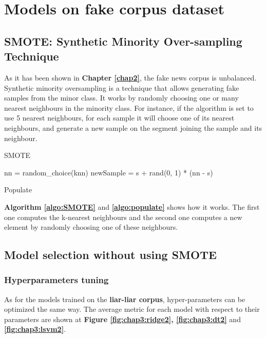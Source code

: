 \section{Models on fake corpus dataset}
\subsection{SMOTE: Synthetic Minority Over-sampling Technique\cite{Chawla2011}}
As it has been shown in \textbf{Chapter \ref{chap2}}, the fake news corpus is unbalanced. Synthetic minority oversampling is a technique that allows generating fake samples from the minor class. It works by randomly choosing one or many nearest neighbours in the minority class. For instance, if the algorithm is set to use 5 nearest neighbours, for each sample it will choose one of its nearest neighbours, and generate a new sample on the segment joining the sample and its neighbour. 
\begin{algorithm}
  \caption{SMOTE}
  \label{algo:SMOTE}
\end{algorithm}
\begin{algorithm}
 nn = random\_choice(knn)\;
 newSample = s + rand(0, 1) * (nn - s)\;
 \caption{Populate}
 \label{algo:populate}
\end{algorithm}
\textbf{Algorithm \ref{algo:SMOTE}} and \textbf{\ref{algo:populate}} shows how it works. The first one computes the k-nearest neighbours and the second one computes a new element by randomly choosing one of these neighbours. 
\subsection{Model selection without using SMOTE}
\subsubsection{Hyperparameters tuning}
As for the models trained on the \textbf{liar-liar corpus}, hyper-parameters can be optimized the same way. The average metric for each model with respect to their parameters are shown at \textbf{Figure \ref{fig:chap3:ridge2}, \ref{fig:chap3:dt2}} and \textbf{\ref{fig:chap3:lsvm2}}. \\


